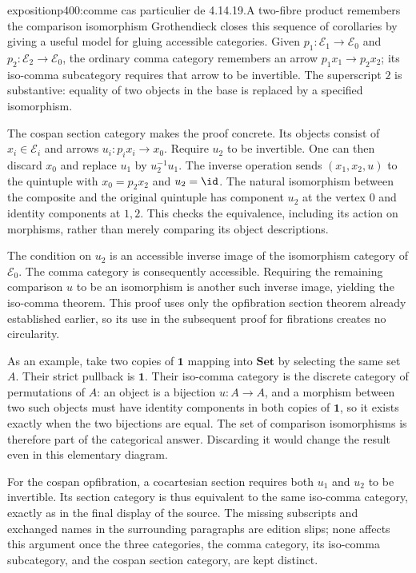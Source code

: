 \begin{dcomment}{exposition}{p400:comme cas particulier de 4.14.19.}{A two-fibre product remembers the comparison isomorphism}
Grothendieck closes this sequence of corollaries by giving a useful model for gluing accessible categories. Given $p_1:\mathcal E_1\to\mathcal E_0$ and $p_2:\mathcal E_2\to\mathcal E_0$, the ordinary comma category remembers an arrow $p_1x_1\to p_2x_2$; its iso-comma subcategory requires that arrow to be invertible. The superscript $2$ is substantive: equality of two objects in the base is replaced by a specified isomorphism.

The cospan section category makes the proof concrete. Its objects consist of $x_i\in\mathcal E_i$ and arrows $u_i:p_ix_i\to x_0$. Require $u_2$ to be invertible. One can then discard $x_0$ and replace $u_1$ by $u_2^{-1}u_1$. The inverse operation sends $(x_1,x_2,u)$ to the quintuple with $x_0=p_2x_2$ and $u_2=\id$. The natural isomorphism between the composite and the original quintuple has component $u_2$ at the vertex $0$ and identity components at $1,2$. This checks the equivalence, including its action on morphisms, rather than merely comparing its object descriptions.

The condition on $u_2$ is an accessible inverse image of the isomorphism category of $\mathcal E_0$. The comma category is consequently accessible. Requiring the remaining comparison $u$ to be an isomorphism is another such inverse image, yielding the iso-comma theorem. This proof uses only the opfibration section theorem already established earlier, so its use in the subsequent proof for fibrations creates no circularity.

As an example, take two copies of $\mathbf1$ mapping into $\mathbf{Set}$ by selecting the same set $A$. Their strict pullback is $\mathbf1$. Their iso-comma category is the discrete category of permutations of $A$: an object is a bijection $u:A\to A$, and a morphism between two such objects must have identity components in both copies of $\mathbf1$, so it exists exactly when the two bijections are equal. The set of comparison isomorphisms is therefore part of the categorical answer. Discarding it would change the result even in this elementary diagram.

For the cospan opfibration, a cocartesian section requires both $u_1$ and $u_2$ to be invertible. Its section category is thus equivalent to the same iso-comma category, exactly as in the final display of the source. The missing subscripts and exchanged names in the surrounding paragraphs are edition slips; none affects this argument once the three categories, the comma category, its iso-comma subcategory, and the cospan section category, are kept distinct.
\end{dcomment}

